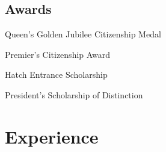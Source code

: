 \documentclass[]{friggeri-cv}
\begin{document}
\begin{aside}
	\section{Awards}
	\begin{description}\raggedleft
		\item Queen's Golden Jubilee Citizenship Medal
		\item Premier's Citizenship Award
		\item Hatch Entrance Scholarship
		\item President's Scholarship of Distinction
	\end{description}
\end{aside}

\section{Experience}
\end{document}
